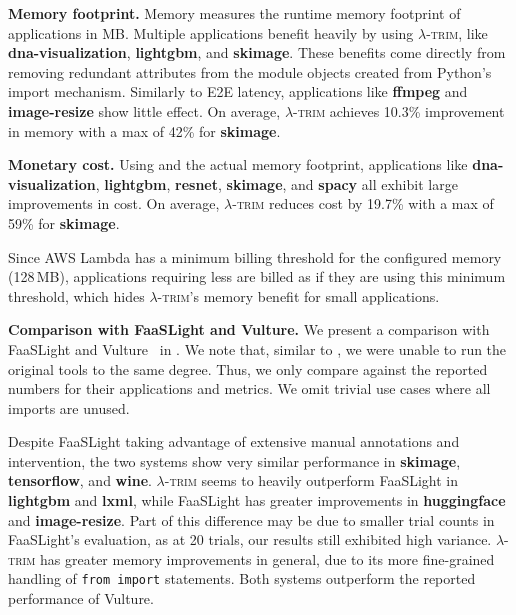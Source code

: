 \documentclass[sigplan,screen]{acmart}
\newcommand{\sys}{\textsc{\ensuremath{\lambda}-trim}\xspace}
\newcommand{\heading}[1]{\vspace{4pt}\noindent\textbf{#1.}}
\newcommand{\application}[1]{{\textcolor{pennblue}{\textbf{#1}}}}
\begin{document}
\heading{Memory footprint}
\label{ssec:eval-memory}
Memory measures the runtime memory footprint of applications in MB.
Multiple applications benefit heavily by using \sys, like \application{dna-visualization}, \application{lightgbm}, and \application{skimage}.
These benefits come directly from removing redundant attributes from the module objects created from Python's import mechanism.
Similarly to E2E latency, applications like \application{ffmpeg} and \application{image-resize} show little effect.
On average, \sys achieves 10.3\% improvement in memory with a max of 42\% for \application{skimage}.


\heading{Monetary cost}
Using  and the actual memory footprint,
applications like \application{dna-visualization}, \application{lightgbm}, \application{resnet}, \application{skimage}, and \application{spacy} all exhibit large improvements in cost.
On average, \sys reduces cost by 19.7\% with a max of 59\% for \application{skimage}.

Since AWS Lambda has a minimum billing threshold for the configured memory (128\,MB), applications requiring less are billed as if they are using this minimum threshold, which hides \sys's memory benefit for small applications.


\heading{Comparison with FaaSLight and Vulture}
We present a comparison with FaaSLight \cite{faaslight2023} and Vulture~\cite{vulture} in .
We note that, similar to \cite{libprof2024}, we were unable to run the original tools to the same degree.
Thus, we only compare against the reported numbers for their applications and metrics.
We omit trivial use cases where all imports are unused.

Despite FaaSLight taking advantage of extensive manual annotations and intervention, the two systems show very similar performance in \application{skimage}, \application{tensorflow}, and \application{wine}.
\sys seems to heavily outperform FaaSLight in \application{lightgbm} and \application{lxml}, while FaaSLight has greater improvements in \application{huggingface} and \application{image-resize}.
Part of this difference may be due to smaller trial counts in FaaSLight's evaluation, as at 20 trials, our results still exhibited high variance.
\sys has greater memory improvements in general, due to its more fine-grained handling of \verb|from import| statements.
Both systems outperform the reported~\cite{faaslight2023} performance of Vulture.
\end{document}
